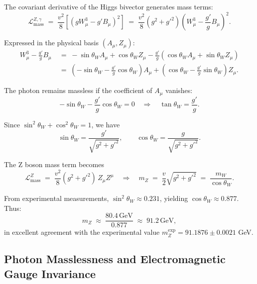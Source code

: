 \documentclass[11pt,a4paper]{article}
\newcommand{\Lag}{\mathcal{L}}
\theoremstyle{definition}
\theoremstyle{plain}
\theoremstyle{remark}
\begin{document}
The covariant derivative of the Higgs bivector generates mass terms:
\begin{equation}
  \Lag_{\text{mass}}^{Z,\gamma} \;=\; \frac{v^2}{8}\left[\left(gW_\mu^3 - g'B_\mu\right)^2\right]
  \;=\; \frac{v^2}{8}(g^2 + g'^2)\left(W_\mu^3 - \frac{g'}{g}B_\mu\right)^2.
\end{equation}

Expressed in the physical basis $(A_\mu, Z_\mu)$:
\begin{align}
  W_\mu^3 - \frac{g'}{g}B_\mu &\;=\; -\sin\theta_W A_\mu + \cos\theta_W Z_\mu - \frac{g'}{g}\left(\cos\theta_W A_\mu + \sin\theta_W Z_\mu\right) \\
  &\;=\; \left(-\sin\theta_W - \frac{g'}{g}\cos\theta_W\right)A_\mu + \left(\cos\theta_W - \frac{g'}{g}\sin\theta_W\right)Z_\mu.
\end{align}

The photon remains massless if the coefficient of $A_\mu$ vanishes:
\begin{equation}
  -\sin\theta_W - \frac{g'}{g}\cos\theta_W = 0
  \quad\Rightarrow\quad
  \tan\theta_W = \frac{g'}{g}.
\end{equation}

Since $\sin^2\theta_W + \cos^2\theta_W = 1$, we have
\begin{equation}
  \sin\theta_W = \frac{g'}{\sqrt{g^2 + g'^2}}, \qquad
  \cos\theta_W = \frac{g}{\sqrt{g^2 + g'^2}}.
\end{equation}

The Z boson mass term becomes
\begin{equation}
  \Lag_{\text{mass}}^{Z} \;=\; \frac{v^2}{8}(g^2 + g'^2)\,Z_\mu Z^\mu
  \quad\Rightarrow\quad
  \boxed{m_Z \;=\; \frac{v}{2}\sqrt{g^2 + g'^2} \;=\; \frac{m_W}{\cos\theta_W}.}
  \label{eq:z-mass}
\end{equation}

From experimental measurements, $\sin^2\theta_W \approx 0.231$, yielding $\cos\theta_W \approx 0.877$. Thus:
\begin{equation}
  m_Z \;\approx\; \frac{80.4\,\text{GeV}}{0.877} \;\approx\; 91.2\,\text{GeV},
\end{equation}
in excellent agreement with the experimental value $m_Z^{\exp} = 91.1876 \pm 0.0021$ GeV.

\subsection{Photon Masslessness and Electromagnetic Gauge Invariance}
\end{document}
